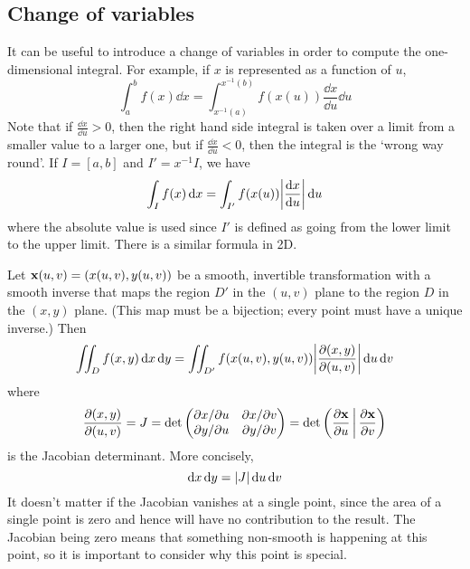 \subsection{Change of variables}
It can be useful to introduce a change of variables in order to compute the one-dimensional integral.
For example, if \(x\) is represented as a function of \(u\),
\[
	\int_a^b f(x) \dd{x} = \int_{x^{-1}(a)}^{x^{-1}(b)} f(x(u)) \frac{\dd{x}}{\dd{u}}\dd{u}
\]
Note that if \(\frac{\dd{x}}{\dd{u}} > 0\), then the right hand side integral is taken over a limit from a smaller value to a larger one, but if \(\frac{\dd{x}}{\dd{u}} < 0\), then the integral is the `wrong way round'.
If \(I = [a,b]\) and \(I' = x^{-1} I\), we have
\[
	\int_I f(x) \dd{x} = \int_{I'} f(x(u)) \abs{\frac{\dd{x}}{\dd{u}}} \dd{u}
\]
where the absolute value is used since \(I'\) is defined as going from the lower limit to the upper limit.
There is a similar formula in 2D.
\begin{proposition}
	Let \(\vb x(u, v) = (x(u, v), y(u, v))\) be a smooth, invertible transformation with a smooth inverse that maps the region \(D'\) in the \((u, v)\) plane to the region \(D\) in the \((x, y)\) plane.
	(This map must be a bijection; every point must have a unique inverse.) Then
	\[
		\iint_D f(x, y) \dd{x} \dd{y} = \iint_{D'} f(x(u, v), y(u, v)) \abs{\frac{\partial (x, y)}{\partial (u, v)}}\dd{u} \dd{v}
	\]
	where
	\[
		\frac{\partial (x, y)}{\partial (u, v)} = J = \det \begin{pmatrix}
			\partial x / \partial u & \partial x / \partial v \\
			\partial y / \partial u & \partial y / \partial v
		\end{pmatrix} = \det \left( \frac{\partial \vb x}{\partial u} \,\middle|\, \frac{\partial \vb x}{\partial v} \right)
	\]
	is the Jacobian determinant.
	More concisely,
	\[
		\dd{x} \dd{y} = \abs{J} \dd{u} \dd{v}
	\]
	It doesn't matter if the Jacobian vanishes at a single point, since the area of a single point is zero and hence will have no contribution to the result.
	The Jacobian being zero means that something non-smooth is happening at this point, so it is important to consider why this point is special.
\end{proposition}
